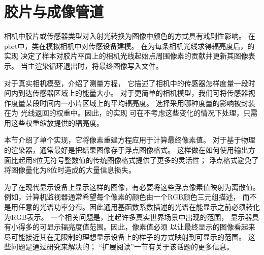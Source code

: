 \section{胶片与成像管道}\label{sec:胶片与成像管道}
相机中胶片或传感器类型对入射光转换为图像中颜色的方式具有戏剧性影响。
在pbrt中，类在模拟相机中对传感设备建模。
在为每条相机光线求得辐亮度后，的实现
决定了样本对胶片平面上的相机光线起始点周围像素的贡献并更新其图像表示。
当主渲染循环退出时，将最终图像写入文件。

对于真实相机模型，介绍了测量方程，
它描述了相机中的传感器怎样度量一段时间内到达传感器区域上的能量大小。
对于更简单的相机模型，我们可将传感器视作度量某段时间内一小片区域上的平均辐亮度。
选择采用哪种度量的影响被封装在为
光线返回的权重中。因此，的实现
可在不考虑这些变化的情况下处理，只需用这些权重缩放提供的辐亮度。

本节介绍了单个实现，它将像素重建方程应用于计算最终像素值。
对于基于物理的渲染器，通常最好是把结果图像存于浮点图像格式。
这样做在如何使用输出方面比起用8位无符号整数值的传统图像格式提供了更多的灵活性；
浮点格式避免了将图像量化为8位时造成的大量信息损失。

为了在现代显示设备上显示这样的图像，有必要将这些浮点像素值映射为离散值。
例如，计算机监视器通常希望每个像素的颜色由一个RGB颜色三元组描述，
而不是用任意的光谱功率分布。因此通用基函数系数描述的光谱在能显示之前必须转化为RGB表示。
一个相关问题是，比起许多真实世界场景中出现的范围，
显示器具有小得多的可显示辐亮度值范围。因此，像素值必须
以让最终显示的图像看起来尽可能接近其在无限制的理想显示设备上的样子的方式映射到可显示的范围。
这些问题是通过研究来解决的；
“扩展阅读”一节有关于该话题的更多信息。

